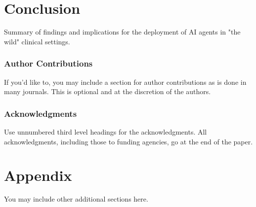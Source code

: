\documentclass{article} %
\begin{document}
\section{Conclusion}
Summary of findings and implications for the deployment of AI agents in "the wild" clinical settings.

\subsubsection*{Author Contributions}
If you'd like to, you may include  a section for author contributions as is done
in many journals. This is optional and at the discretion of the authors.

\subsubsection*{Acknowledgments}
Use unnumbered third level headings for the acknowledgments. All
acknowledgments, including those to funding agencies, go at the end of the paper.





\appendix
\section{Appendix}
You may include other additional sections here.
\end{document}
